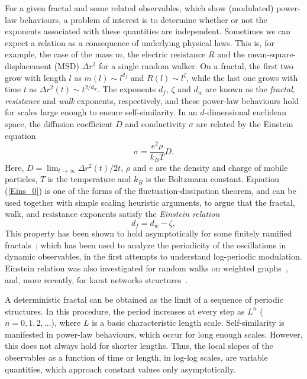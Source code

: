 \documentclass[12pt]{iopart}
\begin{document}
For a given fractal and  some related observables, which show
 (modulated) power-law behaviours, 
a problem of interest is to determine
whether or not the exponents associated with these quantities are independent.
Sometimes we can expect a relation as a consequence of underlying
physical laws. This is, for example, the case of the mass $m$,
the electric resistance $R$ and the mean-square-displacement
(MSD) $\Delta r^2$ for a single random walker. On a fractal,
the first two
grow with length $l$ as $m(l)\sim l^{d_f}$
and $R(l)\sim l^\zeta$, while the last one grows with time $t$ as
$\Delta r^2(t)\sim t^{2/d_w}$. The exponents $d_f$, $\zeta$ and $d_w$
are known as the {\it fractal}, {\it resistance} and {\it walk} exponents,
respectively, and these power-law behaviours hold for 
scales large enough to ensure self-similarity.
In an $d$-dimensional euclidean space, the diffusion coefficient $D$ and
conductivity $\sigma$ are related by the Einstein equation
\cite{havlin1996} 
\begin{equation}
  \sigma=\frac{e^2\rho}{k_BT} D.
  \label{Eins_0}
\end{equation}
Here, $D=\lim_{t\to\infty}\Delta r^2(t)/2t$, $\rho$ and $e$ are the density
and charge of mobile particles, $T$ is the temperature and $k_B$ is the
Boltzmann constant. Equation (\ref{Eins_0})  is one of the forms of the
fluctuation-dissipation theorem, and can be used together with simple
scaling heuristic arguments, to argue that  the fractal, walk, and
resistance exponents satisfy the {\it Einstein relation}~\cite{havlin1996}
\begin{equation}
  d_f=d_w-\zeta,
  \label{Eins_1}
\end{equation}
This property has been shown to hold 
asymptotically for some finitely ramified 
fractals~\cite{Given_1983,Franz_2001}; which has been 
used to analyze the periodicity of the
oscillations in dynamic observables, in the first attempts to 
understand log-periodic modulation\cite{Maltz_2008}.
Einstein relation was also investigated for random walks on weighted
graphs~\cite{Telcs2006}, and,  more recently, for karst networks
structures~\cite{Hendrick_2016}.

A deterministic fractal can be obtained as the limit of 
a sequence of periodic structures. In this procedure, the period increases
at every step as $L^n$ ($n=0,1,2,...$),
where $L$ is a basic characteristic length scale. Self-similarity is 
manifested in power-law behaviours, which occur for long
enough scales. However, this does not always hold  for
shorter lengths. Thus, the local slopes of the observables as a function of time or
length, in log-log scales, are variable quantities, which approach 
constant values only asymptotically. 
\end{document}
